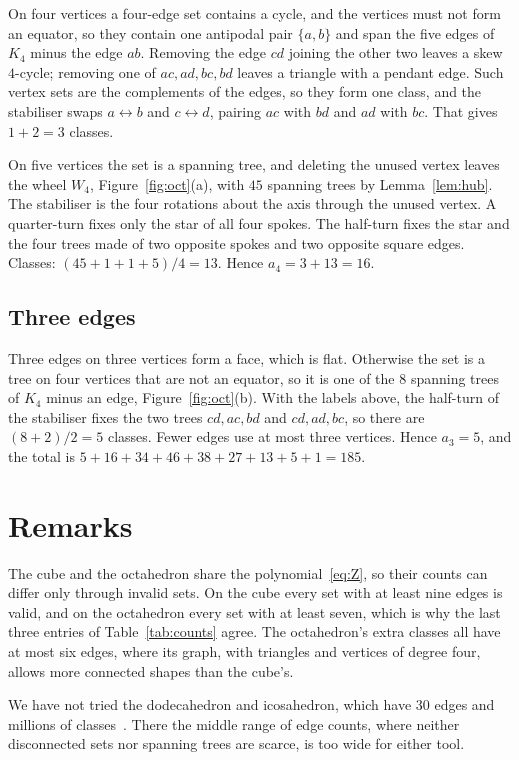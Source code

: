 \documentclass[11pt]{amsart}
\theoremstyle{remark}
\begin{document}
On four vertices a four-edge set contains a cycle, and the vertices must not form an equator, so they contain one antipodal pair $\{a,b\}$ and span the five edges of $K_4$ minus the edge $ab$. Removing the edge $cd$ joining the other two leaves a skew $4$-cycle; removing one of $ac,ad,bc,bd$ leaves a triangle with a pendant edge. Such vertex sets are the complements of the edges, so they form one class, and the stabiliser swaps $a\leftrightarrow b$ and $c\leftrightarrow d$, pairing $ac$ with $bd$ and $ad$ with $bc$. That gives $1+2=3$ classes.

On five vertices the set is a spanning tree, and deleting the unused vertex leaves the wheel $W_4$, Figure~\ref{fig:oct}(a), with $45$ spanning trees by Lemma~\ref{lem:hub}. The stabiliser is the four rotations about the axis through the unused vertex. A quarter-turn fixes only the star of all four spokes. The half-turn fixes the star and the four trees made of two opposite spokes and two opposite square edges. Classes: $(45+1+1+5)/4=13$. Hence $a_4=3+13=16$.

\subsection{Three edges}

Three edges on three vertices form a face, which is flat. Otherwise the set is a tree on four vertices that are not an equator, so it is one of the $8$ spanning trees of $K_4$ minus an edge, Figure~\ref{fig:oct}(b). With the labels above, the half-turn of the stabiliser fixes the two trees $cd,ac,bd$ and $cd,ad,bc$, so there are $(8+2)/2=5$ classes. Fewer edges use at most three vertices. Hence $a_3=5$, and the total is $5+16+34+46+38+27+13+5+1=185$.

\section{Remarks}\label{sec:remarks}

The cube and the octahedron share the polynomial~\eqref{eq:Z}, so their counts can differ only through invalid sets. On the cube every set with at least nine edges is valid, and on the octahedron every set with at least seven, which is why the last three entries of Table~\ref{tab:counts} agree. The octahedron's extra classes all have at most six edges, where its graph, with triangles and vertices of degree four, allows more connected shapes than the cube's.

We have not tried the dodecahedron and icosahedron, which have $30$ edges and millions of classes~\cite{VJ}. There the middle range of edge counts, where neither disconnected sets nor spanning trees are scarce, is too wide for either tool.
\end{document}
